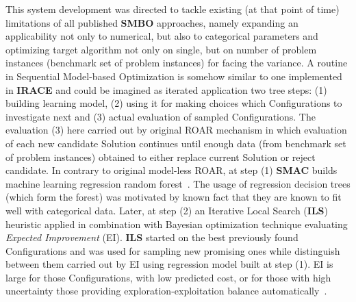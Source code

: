 This system development was directed to tackle existing (at that point of time) limitations of all published \textbf{SMBO} approaches, namely expanding an applicability not only to numerical, but also to categorical parameters and optimizing target algorithm not only on single, but on number of problem instances (benchmark set of problem instances) for facing the variance.
A routine in Sequential Model-based Optimization is somehow similar to one implemented in \textbf{IRACE} and could be imagined as iterated application two tree steps: (1) building learning model, (2) using it for making choices which Configurations to investigate next and (3) actual evaluation of sampled Configurations.
The evaluation (3) here carried out by original ROAR mechanism in which evaluation of each new candidate Solution continues until enough data (from benchmark set of problem instances) obtained to either replace current Solution or reject candidate. In contrary to original model-less ROAR, at step (1) \textbf{SMAC} builds machine learning regression random forest~\cite{breiman2001random}. The usage of regression decision trees (which form the forest) was motivated by known fact that they are known to fit well with categorical data. Later, at step (2) an Iterative Local Search (\textbf{ILS}) heuristic applied in combination with Bayesian optimization technique evaluating \textit{Expected Improvement} (EI). \textbf{ILS} started on the best previously found Configurations and was used for sampling new promising ones while distinguish between them carried out by EI using regression model built at step (1). EI is large for those Configurations, with low predicted cost, or for those with high uncertainty those providing exploration-exploitation balance automatically~\cite{jones1998efficient}.


